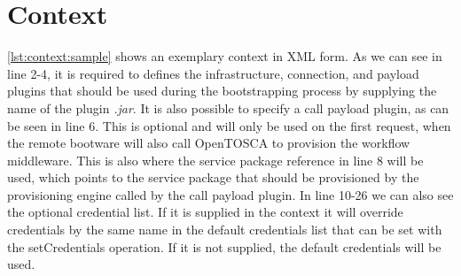 \section{Context}
\label{implementation:context}

\vspace*{\baselineskip}

\autoref{lst:context:sample} shows an exemplary context in XML form.
As we can see in line 2-4, it is required to defines the infrastructure, connection, and payload plugins that should be used during the bootstrapping process by supplying the name of the plugin \textit{.jar}.
It is also possible to specify a call payload plugin, as can be seen in line 6.
This is optional and will only be used on the first request, when the remote bootware will also call OpenTOSCA to provision the workflow middleware.
This is also where the service package reference in line 8 will be used, which points to the service package that should be provisioned by the provisioning engine called by the call payload plugin.
In line 10-26 we can also see the optional credential list.
If it is supplied in the context it will override credentials by the same name in the default credentials list that can be set with the setCredentials operation.
If it is not supplied, the default credentials will be used.
